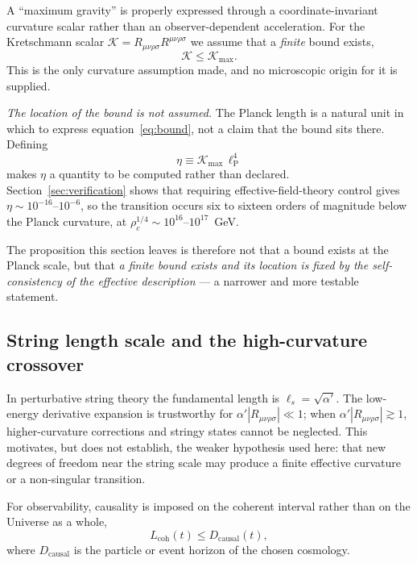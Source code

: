 \documentclass[a4paper,11pt]{article}
\begin{document}
A ``maximum gravity'' is properly expressed through a coordinate-invariant curvature scalar rather than an observer-dependent acceleration. For the Kretschmann scalar $\mathcal K = R_{\mu\nu\rho\sigma}R^{\mu\nu\rho\sigma}$ we assume that a \emph{finite} bound exists,
\begin{equation}
\mathcal K \le \mathcal K_{\max}.
\label{eq:bound}
\end{equation}
This is the only curvature assumption made, and no microscopic origin for it is supplied.

\emph{The location of the bound is not assumed.} The Planck length is a natural unit in which to express equation~\eqref{eq:bound}, not a claim that the bound sits there. Defining
\begin{equation}
\eta \equiv \mathcal K_{\max}\,\ell_\mathrm{P}^{4}
\label{eq:eta}
\end{equation}
makes $\eta$ a quantity to be computed rather than declared. Section~\ref{sec:verification} shows that requiring effective-field-theory control gives $\eta\sim10^{-16}$--$10^{-6}$, so the transition occurs six to sixteen orders of magnitude below the Planck curvature, at $\rho_c^{1/4}\sim10^{16}$--$10^{17}$~GeV.

The proposition this section leaves is therefore not that a bound exists at the Planck scale, but that \emph{a finite bound exists and its location is fixed by the self-consistency of the effective description} --- a narrower and more testable statement.

\subsection{String length scale and the high-curvature crossover}

In perturbative string theory the fundamental length is $\ell_s=\sqrt{\alpha'}$. The low-energy derivative expansion is trustworthy for $\alpha'|R_{\mu\nu\rho\sigma}|\ll1$; when $\alpha'|R_{\mu\nu\rho\sigma}|\gtrsim1$, higher-curvature corrections and stringy states cannot be neglected. This motivates, but does not establish, the weaker hypothesis used here: that new degrees of freedom near the string scale may produce a finite effective curvature or a non-singular transition.

For observability, causality is imposed on the coherent interval rather than on the Universe as a whole,
\begin{equation}
L_{\mathrm{coh}}(t)\le D_{\mathrm{causal}}(t),
\end{equation}
where $D_{\mathrm{causal}}$ is the particle or event horizon of the chosen cosmology.
\end{document}
